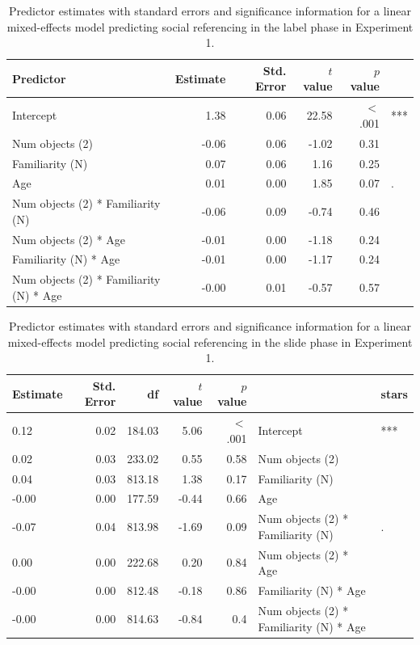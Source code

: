 \documentclass[a4paper,man,apacite,floatsintext]{apa6}
\begin{document}
\begin{table}[tb]
\centering
\begin{tabular}{lrrrrl}
 Predictor & Estimate & Std. Error & $t$ value & $p$ value &  \\ 
  \hline
Intercept & 1.38 & 0.06 & 22.58 & $<$ .001 & *** \\ 
  Num objects (2) & -0.06 & 0.06 & -1.02 & 0.31 &  \\ 
  Familiarity (N) & 0.07 & 0.06 & 1.16 & 0.25 &  \\ 
  Age & 0.01 & 0.00 & 1.85 & 0.07 & . \\ 
  Num objects (2) * Familiarity (N) & -0.06 & 0.09 & -0.74 & 0.46 &  \\ 
  Num objects (2) * Age & -0.01 & 0.00 & -1.18 & 0.24 &  \\ 
  Familiarity (N) * Age & -0.01 & 0.00 & -1.17 & 0.24 &  \\ 
  Num objects (2) * Familiarity (N) * Age & -0.00 & 0.01 & -0.57 & 0.57 &  \\ 
   \hline
\end{tabular}
\caption{Predictor estimates with standard errors and significance information for a linear mixed-effects model predicting social referencing in the label phase in Experiment 1.} 
\label{tab:exp1_l_reg}
\end{table}

\begin{table}[tb]
\centering
\begin{tabular}{lrrrrll}
 Estimate & Std. Error & df & $t$ value & $p$ value &  & stars \\ 
  \hline
0.12 & 0.02 & 184.03 & 5.06 & $<$ .001 & Intercept & *** \\ 
  0.02 & 0.03 & 233.02 & 0.55 & 0.58 & Num objects (2) &  \\ 
  0.04 & 0.03 & 813.18 & 1.38 & 0.17 & Familiarity (N) &  \\ 
  -0.00 & 0.00 & 177.59 & -0.44 & 0.66 & Age &  \\ 
  -0.07 & 0.04 & 813.98 & -1.69 & 0.09 & Num objects (2) * Familiarity (N) & . \\ 
  0.00 & 0.00 & 222.68 & 0.20 & 0.84 & Num objects (2) * Age &  \\ 
  -0.00 & 0.00 & 812.48 & -0.18 & 0.86 & Familiarity (N) * Age &  \\ 
  -0.00 & 0.00 & 814.63 & -0.84 & 0.4 & Num objects (2) * Familiarity (N) * Age &  \\ 
   \hline
\end{tabular}
\caption{Predictor estimates with standard errors and significance information for a linear mixed-effects model predicting social referencing in the slide phase in Experiment 1.} 
\label{tab:exp1_s_reg}
\end{table}
\end{document}
